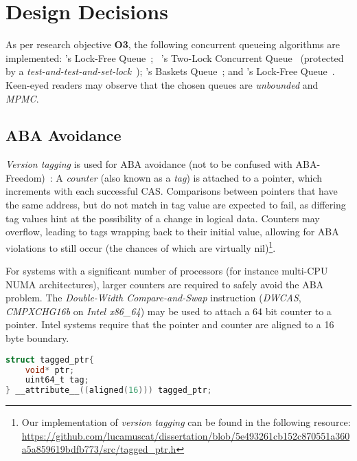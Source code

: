 \section{Design Decisions\label{sec:design_and_implementation_design_decisions}}
As per research objective \textbf{O3}, the following concurrent queueing
algorithms are implemented:
\citeauthor{michael1996simple}'s Lock-Free Queue~\citep{michael1996simple};
~\citeauthor{michael1996simple}'s Two-Lock Concurrent
Queue~\citep{michael1996simple} (protected by a \emph{test-and-test-and-set-lock}~\citep{mellor1991algorithms}); \citeauthor{hoffman2007baskets}'s Baskets
Queue~\citep{hoffman2007baskets}; and \citeauthor{valois1994queues}'s Lock-Free
Queue~\citep{valois1994queues}. Keen-eyed readers may observe that the chosen
queues are \emph{unbounded} and \emph{MPMC}.

\subsection{ABA Avoidance}

\emph{Version tagging} is used for ABA avoidance (not to be confused with
ABA-Freedom)~\citep{dechev2010understanding}:
A \emph{counter} (also known as a \emph{tag}) is attached to a pointer, which increments with
each successful CAS. Comparisons between pointers that have the same address,
but do not match in tag value are expected to fail, as differing tag values hint
at the possibility of a change in logical data. Counters may overflow, leading to tags wrapping back
to their initial value, allowing for ABA violations to still occur (the chances
of which are virtually nil)\footnote{Our implementation of \emph{version
tagging} can be found in the following resource: \url{https://github.com/lucamuscat/dissertation/blob/5e493261cb152c870551a360a5a859619bdfb773/src/tagged_ptr.h}}.

For systems with a significant number of processors (for instance multi-CPU
NUMA architectures), larger counters are required  to safely avoid the ABA
problem. The \emph{Double-Width Compare-and-Swap} instruction (\emph{DWCAS},
\emph{CMPXCHG16b} on \emph{Intel x86\_64}) may be used to attach a 64 bit
counter to a pointer. 
Intel systems require that the pointer and counter are aligned to a 16 byte
boundary.

\begin{lstlisting}[language=C,caption={Struct aligned to 16 bytes, as required by the DWCAS instruction.}]
struct tagged_ptr{
    void* ptr;
    uint64_t tag;
} __attribute__((aligned(16))) tagged_ptr;
\end{lstlisting}

